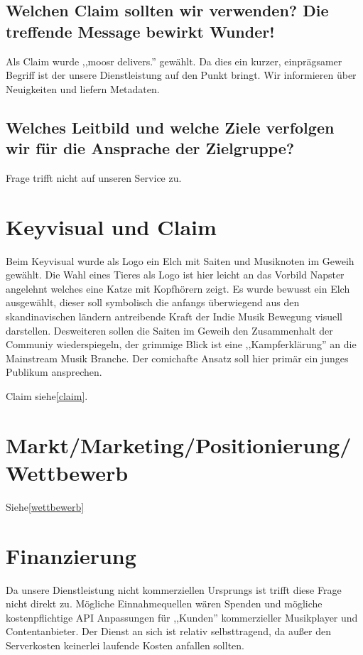 \documentclass[11pt]{scrreprt}
\begin{document}
\label{claim}\section{Welchen Claim sollten wir verwenden?
Die treffende Message bewirkt Wunder!}

Als Claim wurde ,,moosr delivers.'' gewählt. Da dies ein kurzer, einprägsamer
Begriff ist der unsere Dienstleistung auf den Punkt bringt. Wir informieren über
Neuigkeiten und liefern Metadaten.

\section{Welches Leitbild und welche Ziele verfolgen wir
für die Ansprache der Zielgruppe?}

Frage trifft nicht auf unseren Service zu.

\chapter{Keyvisual und Claim}
Beim Keyvisual wurde als Logo ein Elch mit Saiten und Musiknoten im Geweih
gewählt. Die Wahl eines Tieres als Logo ist hier leicht an das Vorbild Napster
angelehnt welches eine Katze mit Kopfhörern zeigt. Es wurde bewusst ein Elch
ausgewählt, dieser soll symbolisch die anfangs überwiegend aus den
skandinavischen ländern antreibende Kraft der Indie Musik Bewegung visuell
darstellen. Desweiteren sollen die Saiten im Geweih den Zusammenhalt der
Communiy wiederspiegeln, der grimmige Blick ist eine ,,Kampferklärung'' an die
Mainstream Musik Branche. Der comichafte Ansatz soll hier primär ein junges
Publikum ansprechen.

Claim siehe\ref{claim}.

\chapter{Markt/Marketing/Positionierung/Wettbewerb}
Siehe\ref{wettbewerb}
\chapter{Finanzierung}
Da unsere Dienstleistung nicht kommerziellen Ursprungs ist trifft diese Frage
nicht direkt zu. Mögliche Einnahmequellen wären Spenden und mögliche kostenpflichtige API
Anpassungen für ,,Kunden'' kommerzieller Musikplayer und Contentanbieter.
Der Dienst an sich ist relativ selbsttragend, da außer den Serverkosten
keinerlei laufende Kosten anfallen sollten.
\end{document}
